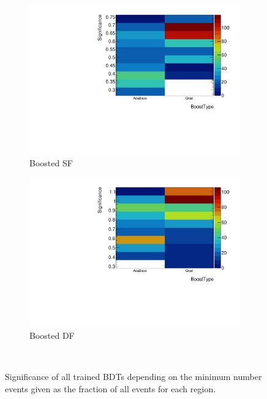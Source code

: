 \begin{figure}[htb]
\begin{subfigure}[t]{0.45\textwidth}
        \includegraphics[width=\textwidth,page=4]{./plots/mva/scan/BOOST_SF_setting_vs_binned_sig.pdf}
        \caption{Boosted SF}
    \end{subfigure}
    \begin{subfigure}[t]{0.45\textwidth}
        \includegraphics[width=\textwidth,page=4]{./plots/mva/scan/BOOST_DF_setting_vs_binned_sig.pdf}
        \caption{Boosted DF}
    \end{subfigure}
    \caption{Significance of all trained BDTs depending on the minimum number events given as the fraction of all events for each region.}~\label{fig:mva:scan:minnodesize}
\end{figure}

